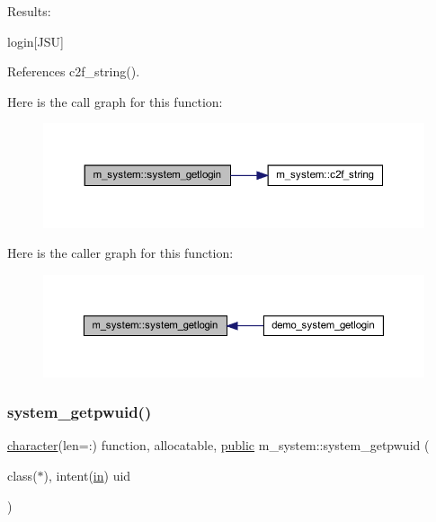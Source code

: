 Results\+:

login\mbox{[}J\+SU\mbox{]} 

References c2f\+\_\+string().

Here is the call graph for this function\+:
\nopagebreak
\begin{figure}[H]
\begin{center}
\leavevmode
\includegraphics[width=350pt]{namespacem__system_a70f78645a1f130734005e190d469529d_cgraph}
\end{center}
\end{figure}
Here is the caller graph for this function\+:
\nopagebreak
\begin{figure}[H]
\begin{center}
\leavevmode
\includegraphics[width=350pt]{namespacem__system_a70f78645a1f130734005e190d469529d_icgraph}
\end{center}
\end{figure}
\mbox{\label{namespacem__system_a59cd13de95dc9a65b444f02614ea39ce}} 
\subsubsection{\texorpdfstring{system\+\_\+getpwuid()}{system\_getpwuid()}}
{\footnotesize\ttfamily \hyperlink{option__stopwatch_83_8txt_abd4b21fbbd175834027b5224bfe97e66}{character}(len=\+:) function, allocatable, \hyperlink{M__stopwatch_83_8txt_a2f74811300c361e53b430611a7d1769f}{public} m\+\_\+system\+::system\+\_\+getpwuid (\begin{DoxyParamCaption}\item[{class($\ast$), intent(\hyperlink{M__journal_83_8txt_afce72651d1eed785a2132bee863b2f38}{in})}]{uid }\end{DoxyParamCaption})}



